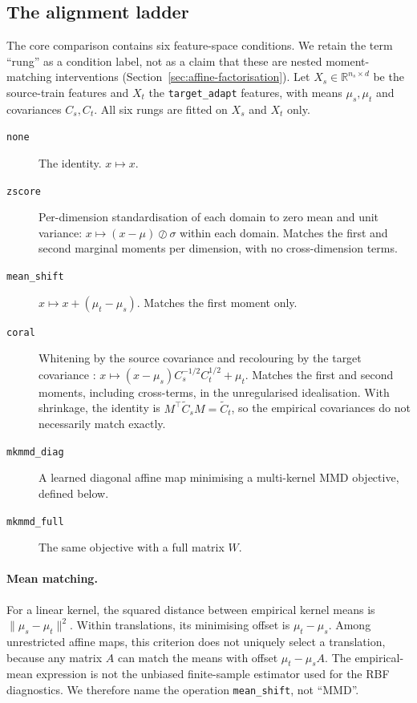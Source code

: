 \subsection{The alignment ladder}
\label{sec:ladder}

The core comparison contains six feature-space conditions. We retain the term
``rung'' as a condition label, not as a claim that these are nested
moment-matching interventions (Section~\ref{sec:affine-factorisation}). Let
$X_s \in \mathbb{R}^{n_s \times d}$ be the source-train features and $X_t$ the
\texttt{target\_adapt} features, with means $\mu_s, \mu_t$ and covariances
$C_s, C_t$. All six rungs are fitted on $X_s$ and $X_t$ only.

\begin{description}
  \item[\texttt{none}] The identity. $x \mapsto x$.
  \item[\texttt{zscore}] Per-dimension standardisation of each domain to zero
    mean and unit variance: $x \mapsto (x - \mu)\oslash\sigma$ within each
    domain. Matches the first and second marginal moments per dimension, with
    no cross-dimension terms.
  \item[\texttt{mean\_shift}] $x \mapsto x + (\mu_t - \mu_s)$. Matches the
    first moment only.
  \item[\texttt{coral}] Whitening by the source covariance and recolouring by
    the target covariance \cite{sun2016deep}:
    $x \mapsto (x - \mu_s) C_s^{-1/2} C_t^{1/2} + \mu_t$. Matches the first and
    second moments, including cross-terms, in the unregularised idealisation.
    With shrinkage, the identity is $M^\top\tilde C_sM=\tilde C_t$, so the
    empirical covariances do not necessarily match exactly.
  \item[\texttt{mkmmd\_diag}] A learned diagonal affine map minimising a
    multi-kernel MMD objective, defined below.
  \item[\texttt{mkmmd\_full}] The same objective with a full matrix $W$.
\end{description}

\paragraph{Mean matching.} For a linear kernel, the squared distance between
empirical kernel means is $\lVert\mu_s-\mu_t\rVert^2$. Within translations,
its minimising offset is $\mu_t-\mu_s$. Among unrestricted affine maps, this
criterion does not uniquely select a translation, because any matrix $A$ can
match the means with offset $\mu_t-\mu_sA$. The empirical-mean expression is
not the unbiased finite-sample estimator used for the RBF diagnostics. We
therefore name the operation \texttt{mean\_shift}, not ``MMD''.

